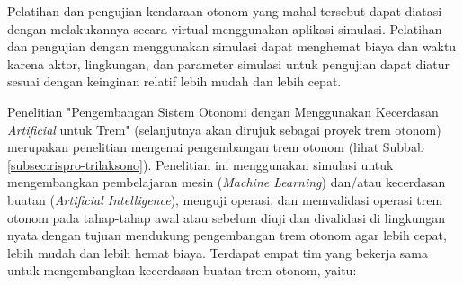 Pelatihan dan pengujian kendaraan otonom yang mahal tersebut dapat diatasi
dengan melakukannya secara virtual menggunakan aplikasi simulasi. Pelatihan dan
pengujian dengan menggunakan simulasi dapat menghemat biaya dan waktu karena
aktor, lingkungan, dan parameter simulasi untuk pengujian dapat diatur sesuai
dengan keinginan relatif lebih mudah dan lebih cepat.

Penelitian "Pengembangan Sistem Otonomi dengan Menggunakan Kecerdasan
\textit{Artificial} untuk Trem" (selanjutnya akan dirujuk sebagai proyek trem
otonom) merupakan penelitian mengenai pengembangan trem otonom (lihat Subbab
\ref{subsec:rispro-trilaksono}). Penelitian ini menggunakan simulasi untuk
mengembangkan pembelajaran mesin (\textit{Machine Learning}) dan/atau kecerdasan
buatan (\textit{Artificial Intelligence}), menguji operasi, dan memvalidasi
operasi trem otonom pada tahap-tahap awal atau sebelum diuji dan divalidasi di
lingkungan nyata dengan tujuan mendukung pengembangan trem otonom agar lebih
cepat, lebih mudah dan lebih hemat biaya. Terdapat empat tim yang bekerja sama
untuk mengembangkan kecerdasan buatan trem otonom, yaitu:

